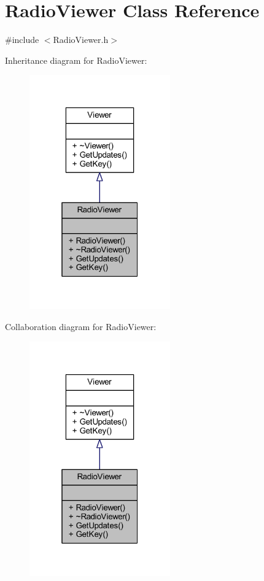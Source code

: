 \hypertarget{class_radio_viewer}{}\section{Radio\+Viewer Class Reference}
\label{class_radio_viewer}


{\ttfamily \#include $<$Radio\+Viewer.\+h$>$}



Inheritance diagram for Radio\+Viewer\+:
\nopagebreak
\begin{figure}[H]
\begin{center}
\leavevmode
\includegraphics[width=172pt]{class_radio_viewer__inherit__graph}
\end{center}
\end{figure}


Collaboration diagram for Radio\+Viewer\+:
\nopagebreak
\begin{figure}[H]
\begin{center}
\leavevmode
\includegraphics[width=172pt]{class_radio_viewer__coll__graph}
\end{center}
\end{figure}
